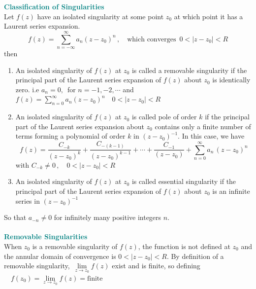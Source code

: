 \documentclass[11pt,a4paper]{article}
\theoremstyle{definition}
\begin{document}
\textbf{\textcolor{teal}{Classification of Singularities}}\\
Let $f(z)$ have an isolated singularity at some point $z_0$ at which point it has a Laurent series expansion.
$$f(z) = \sum^{\infty}_{n = -\infty} a_n ( z-z_0)^n\,, \quad \text{which converges }\,0 < \left|z - z_0\right| < R$$ then
\begin{enumerate}
\item An isolated singularity of $f(z)$ at $z_0$  is called a removable singularity if the principal part of the Laurent series expansion of $f(z)$ about 
$z_0$ is identically zero. i.e $a_n = 0,\,$ for $n = -1, -2, \cdots$ and $\displaystyle{f(z) = \sum^{\infty}_{n = 0}a_n (z - z_0)^n\quad  0 < 
\left|z - z_0\right|
} < R$

\item An isolated singularity of $f(z)$ at $z_0$ is called pole of order $k$ if the principal part of the Laurent series expansion about $z_0$  contains only a finite number of terms forming a polynomial of order $k$ in $(z - z_0)^{-1}$. In this case, we have
$$f(z) = \frac{C_{-k}}{(z - z_0)^k} + \frac{C_{-(k-1)}}{(z - z_0)^{k-1}} + \cdots + \frac{C_{-1}}{(z - z_0)} + \sum^{\infty}_{n  = 0}a_n\,(z - z_0)^n$$
with $C_{-k}\neq 0\,,\quad  0 < \left|z - z_0\right| < R$

\item An isolated singularity of $f(z)$ at $z_0$ is called essential singularity if the principal part of the Laurent series expansion of $f(z)$ about $z_0$ is an infinite series in $(z - z_0)^{-1}$
\end{enumerate}
So that $a_{-n}\neq 0$ for infinitely many positive integers $n$.\\\\





\textbf{\textcolor{teal}{Removable Singularities}}\\
When $z_0$ is a removable singularity of $f(z)$, the function is not defined at $z_0$ and the annular domain of convergence is $0 < \left|z - z_0\right| < R$. By definition of a removable singularity, $\,\lim\limits_{z\rightarrow z_0}f(z)$ exist and is finite, so defining $\quad  \boxed{f(z_0) = \lim\limits_{z \rightarrow z_0} f(z) = \text{finite}}$\\\\
\end{document}
